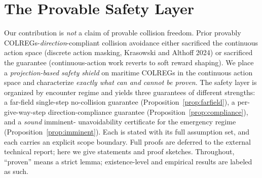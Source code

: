 %
%


\section{The Provable Safety Layer}
\label{sec:provable}

Our contribution is \emph{not} a claim of provable collision freedom. Prior
provably COLREGs-\emph{direction}-compliant collision avoidance either sacrificed
the continuous action space (discrete action masking, Krasowski and Althoff 2024)
or sacrificed the guarantee (continuous-action work reverts to soft reward
shaping). We place a \emph{projection-based safety shield} on maritime COLREGs in
the continuous action space and characterize \emph{exactly what can and cannot be
proven}. The safety layer is organized by encounter regime and yields three
guarantees of different strengths: a far-field single-step no-collision guarantee
(Proposition~\ref{prop:farfield}), a per-give-way-step direction-compliance
guarantee (Proposition~\ref{prop:compliance}), and a \emph{sound} imminent-%
unavoidability certificate for the emergency regime (Proposition~\ref{prop:imminent}).
Each is stated with its full assumption set, and each carries an explicit scope
boundary. Full proofs are deferred to the external technical report; here we give
statements and proof sketches. Throughout, ``proven'' means a strict lemma;
existence-level and empirical results are labeled as such.

